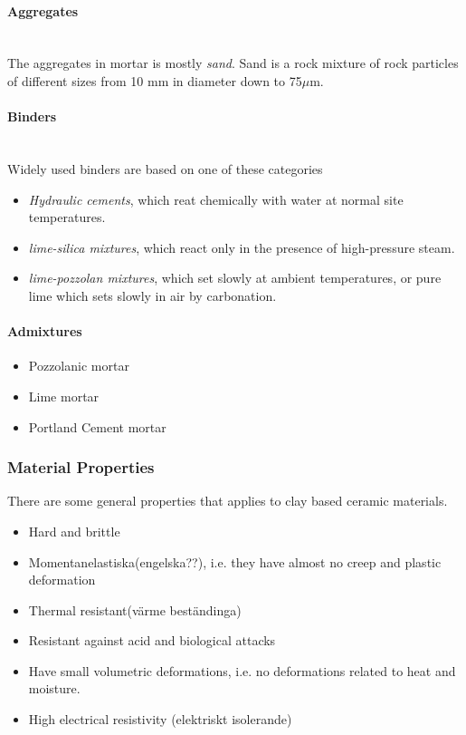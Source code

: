 \paragraph{Aggregates}~\\
The aggregates in mortar is mostly \textit{sand}. Sand is a rock mixture of rock particles of different sizes from 10 mm in diameter down to 75$\mu$m. 


\paragraph{Binders}~\\  Widely used binders are based on one of these categories
\begin{itemize}
\item \textit{Hydraulic cements}, which reat chemically with water at normal site temperatures.
\item \textit{lime-silica mixtures}, which react only in the presence of high-pressure steam.
\item \textit{lime-pozzolan mixtures}, which set slowly at ambient temperatures, or pure lime which sets slowly in air by carbonation.  
\end{itemize}
\paragraph{Admixtures}


\begin{itemize}
\item Pozzolanic mortar
\item Lime mortar
\item Portland Cement mortar
\end{itemize}

\subsubsection{Material Properties}
There are some general properties that applies to clay based ceramic materials.\\

\begin{itemize}
\item Hard and brittle
\item Momentanelastiska(engelska??),
i.e. they have almost no creep and plastic deformation
\item Thermal resistant(värme beständinga)
\item Resistant against acid and biological attacks
\item Have small volumetric deformations,
i.e. no deformations related to heat and moisture.
\item High electrical resistivity  (elektriskt isolerande)
\end{itemize}

